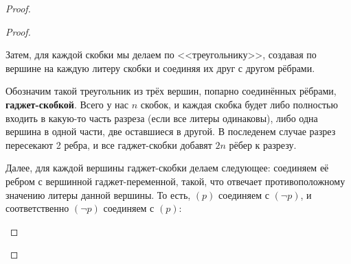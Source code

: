 \documentclass[a4paper,12pt]{article}
\begin{document}
\begin{proof}
\begin{proof}
\begin{center}
        \end{center}
        
        Затем, для каждой скобки мы делаем по <<треугольнику>>, создавая по вершине на каждую литеру скобки и соединяя их друг с другом рёбрами.
        \begin{center}
        \end{center}
        Обозначим такой треугольник из трёх вершин, попарно соединённых рёбрами, \textbf{гаджет-скобкой}. Всего у нас $n$ скобок, и каждая скобка будет либо полностью входить в какую-то часть разреза (если все литеры одинаковы), либо одна вершина в одной части, две оставшиеся в другой. В последенем случае разрез пересекают 2 ребра, и все гаджет-скобки добавят $2n$ рёбер к разрезу.
        
        Далее, для каждой вершины гаджет-скобки делаем следующее: соединяем её ребром с вершинной гаджет-переменной, такой, что отвечает противоположному значению литеры данной вершины. То есть, $(p)$ соединяем с $(\neg p)$, и соответственно $(\neg p)$ соединяем с $(p)$:
        \begin{center}
\end{center}
\end{proof}
\end{proof}
\end{document}
